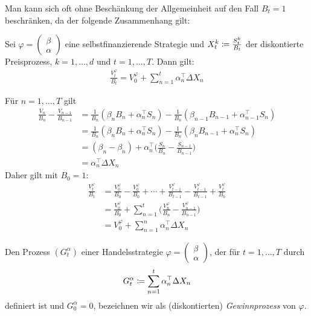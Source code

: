 \documentclass[a4paper,twoside,DIV15,BCOR12mm]{scrbook}
\begin{document}
Man kann sich oft ohne Beschänkung der Allgemeinheit auf den Fall $B_t=1$ beschränken, da der folgende Zusammenhang gilt:
\begin{lemma}
\label{lem:2.3.6}Sei $\varphi
=\left(\begin{smallmatrix}
\beta \\ \alpha
\end{smallmatrix}\right)$ eine selbstfinanzierende Strategie und $X_t^k \da \frac{S_t^k}{B_t}$ der diskontierte Preisprozess, $k=1,\ldots,d$ und $t=1,\ldots,T$. Dann gilt:
\begin{align*}
\frac{V_t^\varphi}{B_t} = V_0^\varphi + \sum_{n=1}^t \alpha_n^\top \Delta X_n
\end{align*}
\end{lemma}

\begin{beweis}
Für $n=1,\ldots,T$ gilt
\begin{align*}
\frac{V_n}{B_n} - \frac{V_{n-1}}{B_{n-1}} 
&= \frac 1 {B_n} (\beta_n B_n + \alpha_n^\top S_n) - \frac1{B_n}(\beta_{n-1}B_{n-1} + \alpha_{n-1}^\top S_n) \\
&= \frac 1 {B_n} (\beta_n B_n + \alpha_n^\top S_n) - \frac1{B_n}(\beta_{n}B_{n-1} + \alpha_{n}^\top S_n) \\
&= (\beta_n - \beta_n) + \alpha_n^\top \bigg(\frac{S_n}{B_n} - \frac{S_{n-1}}{B_{n-1}}\bigg) \\
&= \alpha_n^\top \Delta X_n
\end{align*}
Daher gilt mit $B_0=1$:
\begin{align*}
\frac{V_t^\varphi}{B_t} 
&= \frac{V_0^\varphi}{B_0} - \frac{V_0^\varphi}{B_0} + \cdots + \frac{V_{t-1}^\varphi}{B_{t-1}} - \frac{V_{t-1}^\varphi}{B_{t-1}} + \frac{V_t^\varphi}{B_0} \\
&= \frac{V_0^\varphi}{B_0} + \sum_{n=1}^t \bigg(\frac{V_n^\varphi}{B_n} -  \frac{V_{n-1}^\varphi}{B_{n-1}}\bigg) \\
&= V_0^\varphi + \sum_{n=1}^n \alpha_n^\top \Delta X_n
\end{align*}
\end{beweis}

\begin{definition}
Den Prozess $(G_t^\alpha)$ einer Handelsstrategie $\varphi
=\left(\begin{smallmatrix}
\beta \\ \alpha
\end{smallmatrix}\right)$, der für $t=1,\ldots,T$ durch
\[
G_t^\alpha  \da \sum_{n=1}^t \alpha_n^\top \Delta X_n
\]
definiert ist und $G_0^\alpha = 0$, bezeichnen wir als (diskontierten) \emph{Gewinnprozess} von $\varphi$.
\end{definition}
\end{document}
